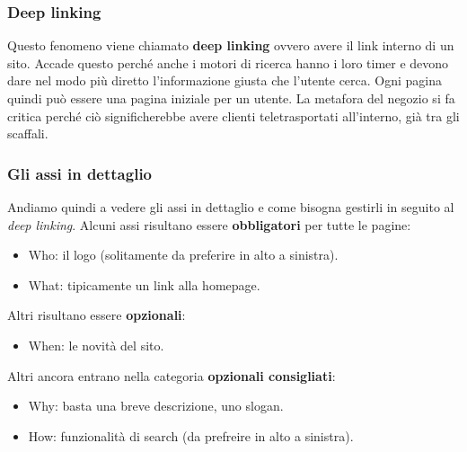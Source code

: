 		\subsubsection{Deep linking}
			Questo fenomeno viene chiamato \textbf{deep linking} ovvero avere il link interno di un sito. Accade questo perché anche i motori di ricerca hanno i loro timer e devono dare nel modo più diretto l'informazione giusta che l'utente cerca.
		Ogni pagina quindi può essere una pagina iniziale per un utente. La metafora del negozio si fa critica perché ciò significherebbe avere clienti teletrasportati all'interno, già tra gli scaffali.
		
		\subsubsection{Gli assi in dettaglio}
			Andiamo quindi a vedere gli assi in dettaglio e come bisogna gestirli in seguito al \emph{deep linking}.
			Alcuni assi risultano essere \textbf{obbligatori} per tutte le pagine:
			\begin{itemize}
				\item Who: il logo (solitamente da preferire in alto a sinistra).
				\item What: tipicamente un link alla homepage.
			\end{itemize}
			Altri risultano essere \textbf{opzionali}:
			\begin{itemize}
				\item When: le novità del sito.
			\end{itemize}
			Altri ancora entrano nella categoria \textbf{opzionali consigliati}:
			\begin{itemize}
				\item Why: basta una breve descrizione, uno slogan.
				\item How: funzionalità di search (da prefreire in alto a sinistra).
			\end{itemize}
		
